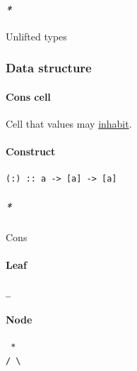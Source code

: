 \documentclass[11pt]{article}
\begin{document}
\paragraph{\emph{*}}
\label{sec:org0bebd5b}

\label{orgac3b10a}Unlifted types\\

\subsubsection{\label{org51ce163}Data structure}
\label{sec:org8fa1ff3}
\paragraph{\label{org7b4826a}Cons cell}
\label{sec:org498be26}
Cell that values may \hyperref[orge1ae7f8]{inhabit}.\\

\paragraph{\label{org3eb9b19}Construct}
\label{sec:org7058ea6}
\begin{verbatim}
(:) :: a -> [a] -> [a]
\end{verbatim}

\subparagraph{\emph{*}}
\label{sec:org6facf88}

\label{org803d284}Cons\\

\paragraph{\label{org643f919}Leaf}
\label{sec:orgc2da279}
\begin{verbatim}
_
\end{verbatim}

\paragraph{\label{org60b23d6}Node}
\label{sec:org189f1d7}
\begin{verbatim}
 *
/ \
\end{verbatim}
\end{document}
